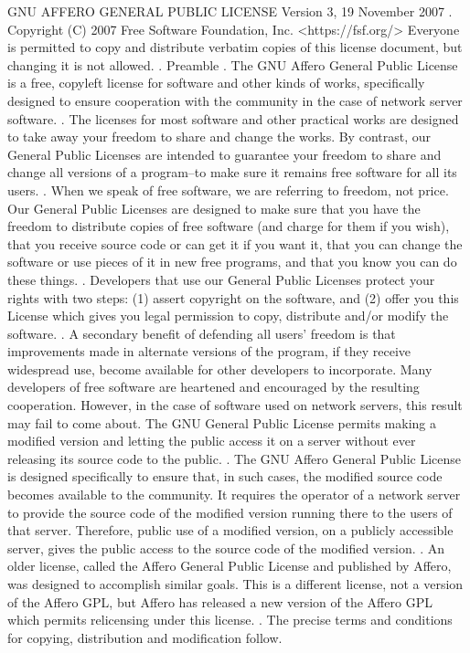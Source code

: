 \begin{script}

                     GNU AFFERO GENERAL PUBLIC LICENSE
                        Version 3, 19 November 2007
 .
  Copyright (C) 2007 Free Software Foundation, Inc. <https://fsf.org/>
  Everyone is permitted to copy and distribute verbatim copies
  of this license document, but changing it is not allowed.
 .
                             Preamble
 .
  The GNU Affero General Public License is a free, copyleft license for
  software and other kinds of works, specifically designed to ensure
  cooperation with the community in the case of network server software.
 .
  The licenses for most software and other practical works are designed
  to take away your freedom to share and change the works.  By contrast,
  our General Public Licenses are intended to guarantee your freedom to
  share and change all versions of a program--to make sure it remains free
  software for all its users.
 .
   When we speak of free software, we are referring to freedom, not
  price.  Our General Public Licenses are designed to make sure that you
  have the freedom to distribute copies of free software (and charge for
  them if you wish), that you receive source code or can get it if you
  want it, that you can change the software or use pieces of it in new
  free programs, and that you know you can do these things.
 .
   Developers that use our General Public Licenses protect your rights
  with two steps: (1) assert copyright on the software, and (2) offer
  you this License which gives you legal permission to copy, distribute
  and/or modify the software.
 .
   A secondary benefit of defending all users' freedom is that
  improvements made in alternate versions of the program, if they
  receive widespread use, become available for other developers to
  incorporate.  Many developers of free software are heartened and
  encouraged by the resulting cooperation.  However, in the case of
  software used on network servers, this result may fail to come about.
  The GNU General Public License permits making a modified version and
  letting the public access it on a server without ever releasing its
  source code to the public.
 .
   The GNU Affero General Public License is designed specifically to
  ensure that, in such cases, the modified source code becomes available
  to the community.  It requires the operator of a network server to
  provide the source code of the modified version running there to the
  users of that server.  Therefore, public use of a modified version, on
  a publicly accessible server, gives the public access to the source
  code of the modified version.
 .
   An older license, called the Affero General Public License and
  published by Affero, was designed to accomplish similar goals.  This is
  a different license, not a version of the Affero GPL, but Affero has
  released a new version of the Affero GPL which permits relicensing under
  this license.
 .
   The precise terms and conditions for copying, distribution and
  modification follow.
\end{script}

